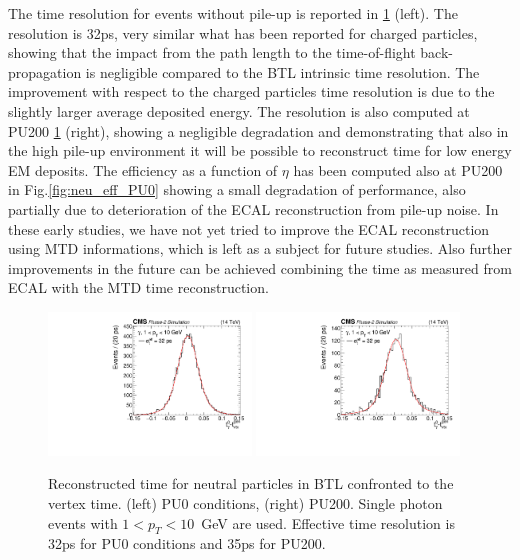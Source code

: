 The time resolution for events without pile-up is reported in \ref{fig:neu_tres} (left). The resolution is 32ps, very similar what has been reported for charged particles, showing that the impact from the path length to the time-of-flight back-propagation is negligible compared to the BTL intrinsic time resolution. The improvement with respect to the charged particles time resolution is due to the slightly larger average deposited energy. The resolution is also computed at PU200 \ref{fig:neu_tres} (right), showing a negligible degradation and demonstrating that also in the high pile-up environment it will be possible to reconstruct time for low energy EM deposits. The efficiency as a function of $\eta$ has been computed also at PU200 in Fig.\ref{fig:neu_eff_PU0} showing a small degradation of performance, also partially due to deterioration of the ECAL reconstruction from pile-up noise. In these early studies, we have not yet tried to improve the ECAL reconstruction using MTD informations, which is left as a subject for future studies. Also further improvements in the future can be achieved combining the time as measured from ECAL with the MTD time reconstruction.

\begin{figure}[!hbtp]
\centering
\includegraphics[width=0.48\textwidth]{fig/performance/neutrals/t0_resolution_simhtof.pdf}
\includegraphics[width=0.48\textwidth]{fig/performance/neutrals/t0_resolution_simhtof-200PU.pdf}
\caption{Reconstructed time for neutral particles in BTL confronted to the vertex time. (left) PU0 conditions, (right) PU200. Single photon events with $1<p_{T}<10$~GeV are used. Effective time resolution is 32ps for PU0 conditions and 35ps for PU200.}
\label{fig:neu_tres}
\end{figure}
